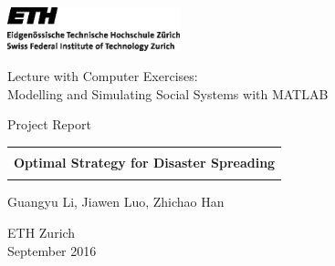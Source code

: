 
\thispagestyle{empty}

\begin{center}
\includegraphics[width=5cm]{ETHlogo.eps}

\bigskip


\bigskip


\bigskip


\LARGE{ 	Lecture with Computer Exercises:\\ }
\LARGE{ Modelling and Simulating Social Systems with MATLAB\\}

\bigskip

\bigskip

\small{Project Report}\\

\bigskip

\bigskip

\bigskip

\bigskip


\begin{tabular}{|c|}
\hline
\\
\textbf{\LARGE{Optimal Strategy for Disaster Spreading}}\\
\\
\hline
\end{tabular}
\bigskip

\bigskip

\bigskip

\LARGE{Guangyu Li, Jiawen Luo, Zhichao Han}



\bigskip

\bigskip

\bigskip

\bigskip

\bigskip

\bigskip

\bigskip

\bigskip

ETH Zurich\\
September 2016\\

\end{center}


